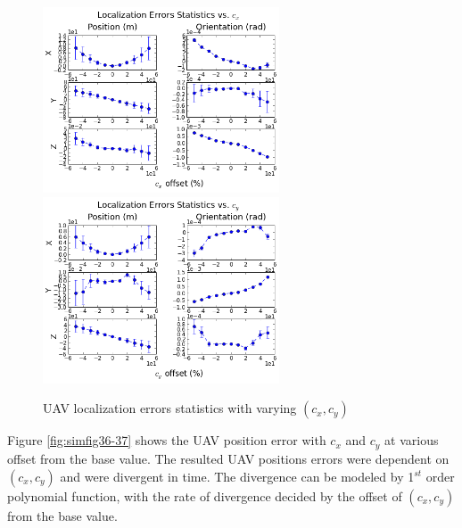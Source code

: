 \begin{figure}[h]
  \centering
  \includegraphics[width=7cm, keepaspectratio=true]{./Figures/SimulationFigures/Figure34.png}
  \includegraphics[width=7cm, keepaspectratio=true]{./Figures/SimulationFigures/Figure35.png}
  \caption{UAV localization errors statistics with varying $(c_x, c_y)$}
  \label{fig:simfig34-35}
\end{figure}

Figure \ref{fig:simfig36-37} shows the UAV position error with $c_x$
and $c_y$ at various offset from the base value. The resulted UAV
positions errors were dependent on $(c_{x}, c_{y})$ and were
divergent in time. The divergence can be modeled by 1$^{st}$ order
polynomial function, with the rate of divergence decided by the offset
of $(c_{x}, c_{y})$ from the base value.

